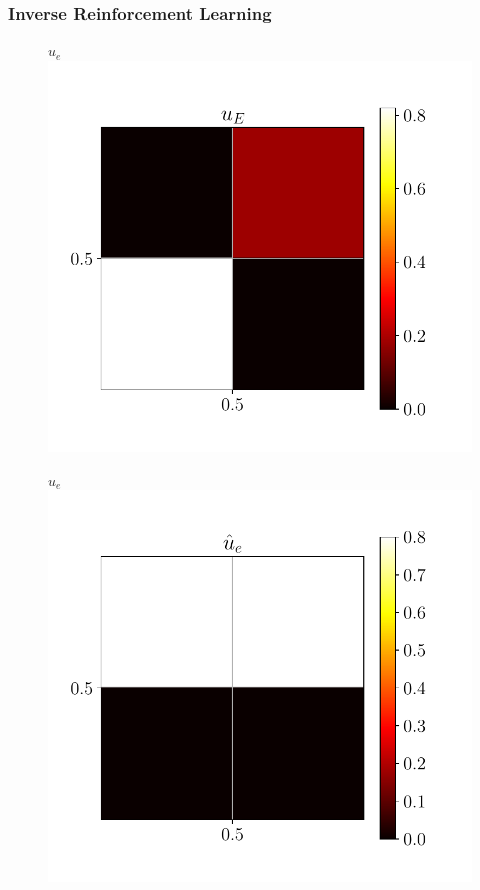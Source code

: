 \documentclass{beamer}
\begin{document}
\begin{frame}
\frametitle{Inverse Reinforcement Learning}
\begin{figure}
  \begin{center}
  \begin{minipage}{0.45\linewidth}
    \centering
    \textbf{$u_e$}
    \includegraphics[width=\linewidth]{../../pres_roil/plots/all_state/ue.pdf}
  \end{minipage}
  \hspace{0.05\linewidth}
  \begin{minipage}{0.45\linewidth}
    \centering
    \textbf{$\hat{u}_e$}
    \includegraphics[width=\linewidth]{../../pres_roil/plots/all_state/uehat.pdf}
  \end{minipage}
  \end{center}
\end{figure}
\end{frame}
\end{document}
